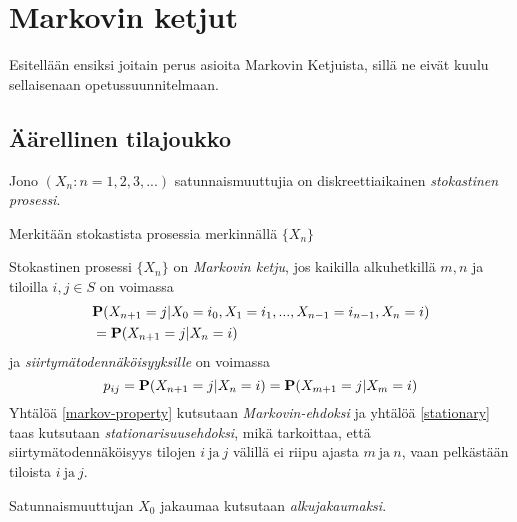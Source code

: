 
\section{Markovin ketjut}

Esitellään ensiksi joitain perus asioita Markovin Ketjuista, sillä ne eivät kuulu sellaisenaan opetussuunnitelmaan. \cite{piiroinen_stokastiset_nodate}

\subsection{Äärellinen tilajoukko}

\begin{maar}
	Jono $(X_n:n=1,2,3,...)$ satunnaismuuttujia on diskreettiaikainen \textit{stokastinen prosessi}.
\end{maar}

\begin{merk}
	Merkitään stokastista prosessia merkinnällä $\{ X_n \}$
\end{merk}

\begin{maar}
	Stokastinen prosessi $\{X_n\}$ on \textit{Markovin ketju}, jos kaikilla alkuhetkillä $m,n$ ja tiloilla $i,j\in S$ on voimassa
	\begin{equation}\label{markov-property}
		\begin{split}
			&\textbf{P}(X_{n+1}=j|X_0=i_0,X_1=i_1,...,X_{n-1}=i_{n-1},X_n=i) \\
		 &= \textbf{P}(X_{n+1}=j|X_n=i) 
		\end{split}
	\end{equation}
	ja \textit{siirtymätodennäköisyyksille} on voimassa 
	\begin{equation}\label{stationary}
		p_{ij}=\textbf{P}(X_{n+1}=j|X_n=i)=\textbf{P}(X_{m+1}=j|X_m=i)
	\end{equation}
	Yhtälöä \ref{markov-property} kutsutaan \textit{Markovin-ehdoksi} ja yhtälöä \ref{stationary} taas kutsutaan \textit{stationarisuusehdoksi}, mikä tarkoittaa, 
	että siirtymätodennäköisyys tilojen $i\ \text{ja}\ j$ välillä ei riipu ajasta $m\ \text{ja}\ n$, vaan pelkästään tiloista $i\ \text{ja}\ j$.
\end{maar}

\begin{maar}
	Satunnaismuuttujan $X_0$ jakaumaa kutsutaan \textit{alkujakaumaksi}. 
\end{maar}

